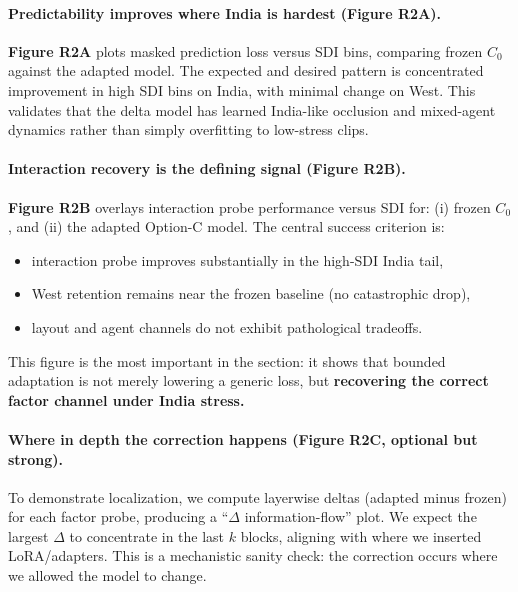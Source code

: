 \vspace{4pt}
\paragraph{Predictability improves where India is hardest (Figure R2A).}
\textbf{Figure R2A} plots masked prediction loss versus SDI bins, comparing frozen $C_0$ against the adapted model. The expected and desired pattern is concentrated improvement in high SDI bins on India, with minimal change on West. This validates that the delta model has learned India-like occlusion and mixed-agent dynamics rather than simply overfitting to low-stress clips.

\vspace{4pt}
\paragraph{Interaction recovery is the defining signal (Figure R2B).}
\textbf{Figure R2B} overlays interaction probe performance versus SDI for: (i) frozen $C_0$, and (ii) the adapted Option-C model. The central success criterion is:
\begin{itemize}[leftmargin=*,itemsep=2pt]
\item interaction probe improves substantially in the high-SDI India tail,
\item West retention remains near the frozen baseline (no catastrophic drop),
\item layout and agent channels do not exhibit pathological tradeoffs.
\end{itemize}
This figure is the most important in the section: it shows that bounded adaptation is not merely lowering a generic loss, but \textbf{recovering the correct factor channel under India stress.}

\vspace{4pt}
\paragraph{Where in depth the correction happens (Figure R2C, optional but strong).}
To demonstrate localization, we compute layerwise deltas (adapted minus frozen) for each factor probe, producing a ``$\Delta$ information-flow'' plot. We expect the largest $\Delta$ to concentrate in the last $k$ blocks, aligning with where we inserted LoRA/adapters. This is a mechanistic sanity check: the correction occurs where we allowed the model to change.

\vspace{4pt}
